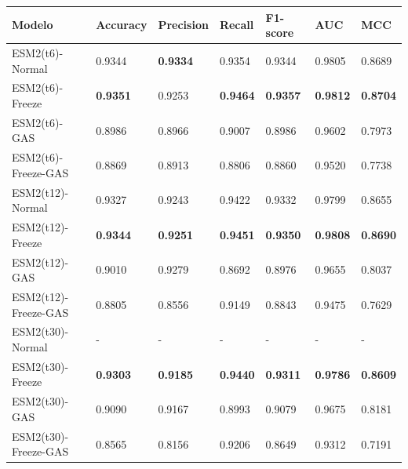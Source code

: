 \begin{table}[h]
	\scriptsize
	\setlength{\tabcolsep}{0.5em} %
	{\renewcommand{\arraystretch}{1.5}%
	\begin{tabular}{lllllll} 
		\textbf{Modelo}       & \textbf{Accuracy} & \textbf{Precision} & \textbf{Recall} & \textbf{F1-score} & \textbf{AUC}    & \textbf{MCC}    \\ \midrule
		ESM2(t6)-Normal             & 0.9344            & \textbf{0.9334}    & 0.9354          & 0.9344            & 0.9805          & 0.8689          \\
		ESM2(t6)-Freeze      & \textbf{0.9351}   & 0.9253             & \textbf{0.9464} & \textbf{0.9357}   & \textbf{0.9812} & \textbf{0.8704} \\
		ESM2(t6)-GAS         & 0.8986            & 0.8966             & 0.9007          & 0.8986            & 0.9602          & 0.7973          \\
		ESM2(t6)-Freeze-GAS  & 0.8869            & 0.8913             & 0.8806          & 0.8860            & 0.9520          & 0.7738          \\ \midrule
		ESM2(t12)-Normal            & 0.9327            & 0.9243             & 0.9422          & 0.9332            & 0.9799          & 0.8655          \\
		ESM2(t12)-Freeze     & \textbf{0.9344}   & \textbf{0.9251}    & \textbf{0.9451} & \textbf{0.9350}   & \textbf{0.9808} & \textbf{0.8690} \\
		ESM2(t12)-GAS        & 0.9010            & 0.9279             & 0.8692          & 0.8976            & 0.9655          & 0.8037          \\
		ESM2(t12)-Freeze-GAS & 0.8805            & 0.8556             & 0.9149          & 0.8843            & 0.9475          & 0.7629          \\ \midrule
		ESM2(t30)-Normal            & -                 & -                  & -               & -                 & -               & -               \\
		ESM2(t30)-Freeze     & \textbf{0.9303}   & \textbf{0.9185}    & \textbf{0.9440} & \textbf{0.9311}   & \textbf{0.9786} & \textbf{0.8609} \\
		ESM2(t30)-GAS        & 0.9090            & 0.9167             & 0.8993          & 0.9079            & 0.9675          & 0.8181          \\
		ESM2(t30)-Freeze-GAS & 0.8565            & 0.8156             & 0.9206          & 0.8649            & 0.9312          & 0.7191          \\ \midrule

\end{tabular}}
\end{table}
